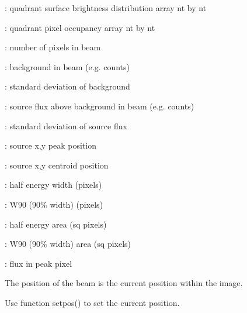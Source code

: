\documentclass[letterpaper,10pt,english]{sphinxmanual}
\begin{document}
\begin{fulllineitems}
\begin{DUlineblock}{0em}
\item[] :     quadrant surface brightness distribution array nt by nt
\item[] :    quadrant  pixel occupancy array nt by nt
\item[] :    number of pixels in beam
\item[] :   background in beam (e.g. counts)
\item[] :  standard deviation of background
\item[] :    source flux above background in beam (e.g. counts)
\item[] :  standard deviation of source flux
\item[] :    source x,y peak position
\item[] :     source x,y centroid position
\item[] :     half energy width (pixels)
\item[] :     W90 (90\% width) (pixels)
\item[] :     half energy area (sq pixels)
\item[] :     W90 (90\% width) area (sq pixels)
\item[] :   flux in peak pixel
\item[] 
\item[] The position of the beam is the current position within the image.
\item[] Use function setpos() to set the current position.
\end{DUlineblock}

\end{fulllineitems}

\end{document}
